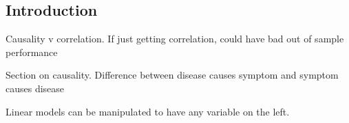 
\subsection{Introduction}

Causality v correlation. If just getting correlation, could have bad out of sample performance

Section on causality. Difference between disease causes symptom and symptom causes disease

Linear models can be manipulated to have any variable on the left.

